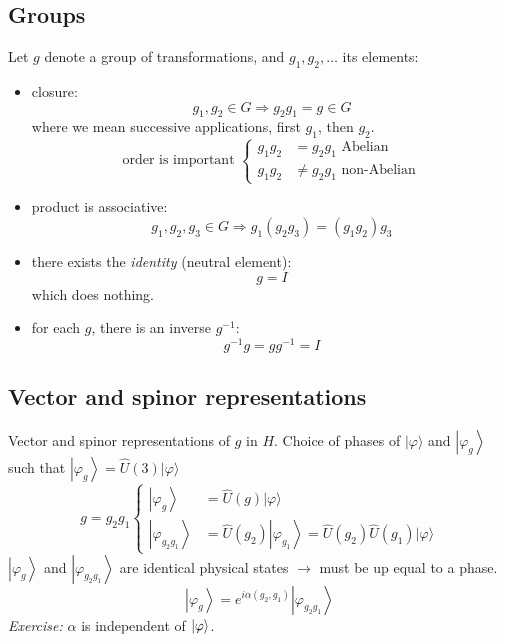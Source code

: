 \documentclass[12pt]{article}
\newcommand{\be}{\begin{equation}}
\newcommand{\ee}{\end{equation}}
\begin{document}

\subsection{Groups}

Let \(g\) denote a group of transformations, and \(g_{1}, g_{2}, \ldots\)
its elements:
\begin{itemize}
\item closure:
\be
g_{1}, g_{2} \in G \Rightarrow g_{2} g_{1}=g \in G
\ee
where we mean successive applications,
first $g_1$, then $g_2$.
\[
\text { order is important }
\left\{
\begin{aligned}
g_{1} g_{2} &=g_{2} g_{1} \text { Abelian } \\ 
g_{1} g_{2} &\neq g_{2} g_{1} \text { non-Abelian }
\end{aligned}
\right.
\]
%
\item product is associative:
\be
g_{1}, g_{2}, g_{3} \in G
\Rightarrow
g_{1}(g_{2} g_{3})=(g_{1} g_{2}) g_{3}
\ee 
%
\item there exists the \emph{identity} (neutral element):
\be
g = I
\ee
which does nothing.
%
\item for each $g$, there is an inverse $g^{-1}$:
\be
g^{-1} g=gg^{-1}=I
\ee
\end{itemize}


\subsection{Vector and spinor representations}

Vector and spinor representations of $g$ in $H$.
Choice of phases of \(|\varphi\rangle\) and \(\left|\varphi_{g}\right\rangle\) such that \(\left|\varphi_{g}\right\rangle=\hat{U}(3)|\varphi\rangle\)
%
\be
g=g_{2} g_{1}
\left\{
\begin{aligned}
\left|\varphi_{g}\right\rangle
&=\hat{U}(g)|\varphi\rangle \\
\left|\varphi_{g_{2} g_{1}}\right\rangle
&=\hat{U}(g_{2})\left|\varphi_{g_{1}}\right\rangle
 =\hat{U}(g_{2}) \hat{U}(g_{1})|\varphi\rangle
\end{aligned}
\right.
\ee
\(\left|\varphi_{g}\right\rangle\) and
\(\left|\varphi_{g_{2} g_{1}}\right\rangle\) 
are identical physical states \(\rightarrow\) must be up equal to a phase.
%
\be
\left|\varphi_{g}\right\rangle=e^{i \alpha(g_{2}, g_{1})}\left|\varphi_{g_{2} g_{1}}\right\rangle
\label{eq:symmetries2}
\ee
\emph{Exercise:} $\alpha$ is independent of $\ket{\varphi}$.
\end{document}
